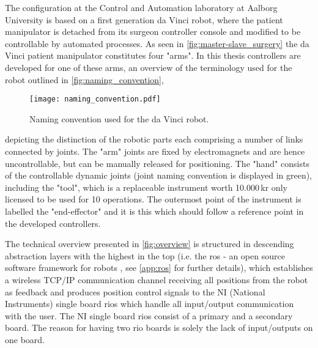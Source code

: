 \vspace{-2mm}
The configuration at the Control and Automation laboratory at Aalborg University is based on a first generation da Vinci robot, where the patient manipulator is detached from its surgeon controller console and modified to be controllable by automated processes. %
As seen in \autoref{fig:master-slave_surgery} the da Vinci patient manipulator constitutes four "arms". In this thesis controllers are developed for one of these arms, 
an overview of the terminology used for the robot  outlined in \autoref{fig:naming_convention},
\begin{figure}[htbp]
\centering
\texttt{[image: naming\_convention.pdf]}
\caption{Naming convention used for the da Vinci robot.}
\label{fig:naming_convention}
\end{figure}
depicting the distinction of the robotic parts each comprising a number of links connected by joints. 
The  "arm"  joints are fixed by electromagnets and are hence uncontrollable, but can be manually released for positioning. 
The  "hand" consists of the controllable dynamic joints (joint naming convention is displayed in green), including the "tool", which is a replaceable instrument worth 10.000\,kr only licensed to be used for 10 operations. The outermost point of the instrument is labelled the "end-effector" and it is  this which should follow a reference point in the developed controllers.

%
%
The technical overview presented in \autoref{fig:overview} is structured in descending abstraction layers with the highest in the top (i.e. the \gls{ros} - an open source software framework for robots \citep{bib:ros}, see \autoref{app:ros} for further details), which establishes a wireless TCP/IP communication channel receiving all positions from the robot as feedback and produces position control signals to the NI (National Instruments) single board \glspl{rio} which handle all input/output communication with the user. The NI single board \glspl{rio} consist of a primary and a secondary board. The reason for having two \gls{rio} boards is solely the lack of input/outputs on one board.

